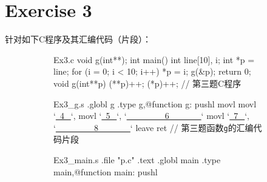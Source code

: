 \documentclass{article}
\begin{document}
\section*{Exercise 3}
针对如下C程序及其汇编代码（片段）：
\begin{figure}
    \begin{multicols}{2}
        \begin{figure}[H]
            \centering
            \begin{verbatimwrite}{Ex3.c}
void g(int**);
int main()
{
    int line[10], i;
    int *p = line;
    for (i = 0; i < 10; i++)
    {
        *p = i;
        g(&p);
    }
    return 0;
}
void g(int**p)
{
    (**p)++;
    (*p)++;
}
// \songti \upshape 第三题C程序
        \end{verbatimwrite}
        \begin{mdframed}[
            style = Default,
            leftmargin = 40pt,
        ]
            
        \end{mdframed}
        \end{figure}
        \begin{figure}[H]
            \centering
            \begin{verbatimwrite}{Ex3_g.s}
.globl g
    .type   g,@function
g:
    pushl   %
    movl    %
    movl    `\underline{~\textcircled{4}~}`, %
    movl    `\underline{~\textcircled{5}~}`, %
    `\underline{~~~~~~~~~\textcircled{6}~~~~~~~}`
    movl    `\underline{~\textcircled{7}~}`, %
    `\underline{~~~~~~~~~\textcircled{8}~~~~~~~}`
    leave
    ret
// \songti \upshape 第三题函数\texttt{g}的汇编代码片段
            \end{verbatimwrite}
            \begin{mdframed}[
                style = Default,
                leftmargin = 40pt,
            ]
                
            \end{mdframed}
        \end{figure}
        \begin{figure}[H]
            \centering
            \begin{verbatimwrite}{Ex3_main.s}
    .file "p.c"
    .text
.globl main
    .type   main,@function
main:
    pushl   %

\end{verbatimwrite}
\end{figure}
\end{multicols}
\end{figure}
\end{document}

